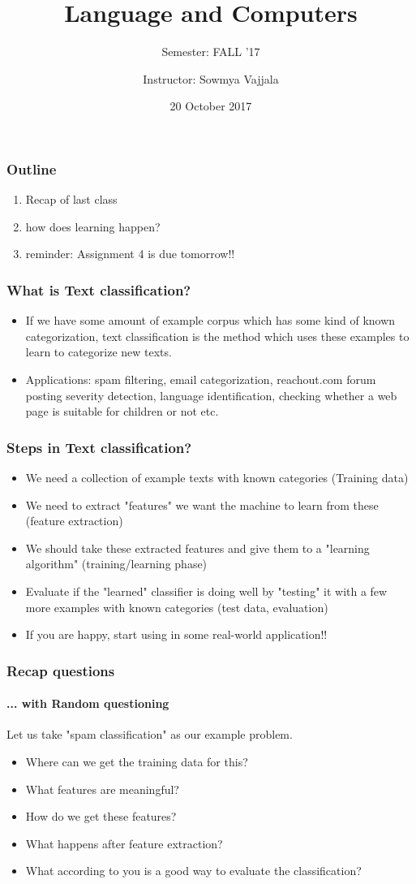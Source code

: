 \documentclass{beamer}
\author[Sowmya Vajjala]{Instructor: Sowmya Vajjala}
\title[LING 120]{Language and Computers}
\subtitle{Semester: FALL '17}
\date{20 October 2017}
\institute{Iowa State University, USA}
\begin{document}
\begin{frame}\titlepage
\end{frame}

\begin{frame}
\frametitle{Outline}
\begin{enumerate}
\item Recap of last class
\item how does learning happen?
\item reminder: Assignment 4 is due tomorrow!!
\end{enumerate}
\end{frame}

\begin{frame}
\frametitle{What is Text classification?}
\begin{itemize}
\item If we have some amount of example corpus which has some kind of known categorization, text classification is the method which uses these examples to learn to categorize new texts. \pause
\item Applications: spam filtering, email categorization, reachout.com forum posting severity detection, language identification, checking whether a web page is suitable for children or not etc.
\end{itemize}
\end{frame}

\begin{frame}
\frametitle{Steps in Text classification?}
\begin{itemize}
\item We need a collection of example texts with known categories (Training data)
\item We need to extract "features" we want the machine to learn from these (feature extraction)
\item We should take these extracted features and give them to a "learning algorithm" (training/learning phase)
\item Evaluate if the "learned" classifier is doing well by "testing" it with a few more examples with known categories (test data, evaluation)
\item If you are happy, start using in some real-world application!!
\end{itemize}
\end{frame}

\begin{frame}
\frametitle{Recap questions}
\framesubtitle{... with Random questioning}
Let us take "spam classification" as our example problem.
\begin{itemize}
\item Where can we get the training data for this? \pause
\item What features are meaningful? \pause
\item How do we get these features? \pause
\item What happens after feature extraction? \pause
\item What according to you is a good way to evaluate the classification?
\end{itemize}
\end{frame}
\end{document}
